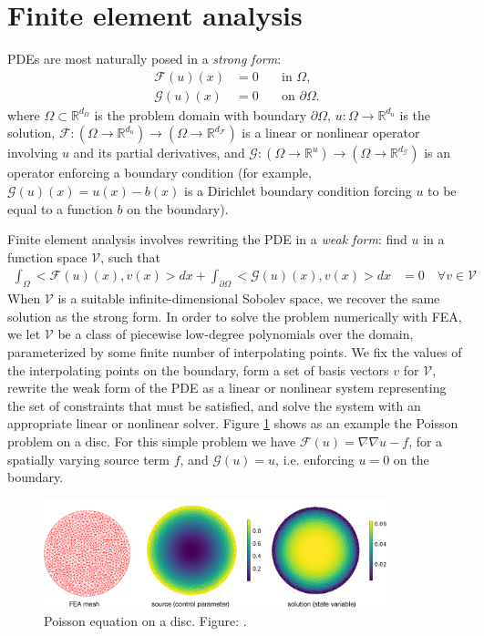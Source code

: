\section{Finite element analysis}
\label{sec:metapde-fea}
PDEs are most naturally posed in a \emph{strong form}:
\begin{align}
\mathcal{F}(u)(x) &= 0 \quad &\text{in } \Omega, \label{eq:metapde-strongform} \\
\mathcal{G}(u)(x) &= 0 \quad &\text{on } \partial \Omega. \label{eq:metapde-bc}
\end{align}
where $\Omega \subset \mathbb{R}^{d_\Omega}$ is the problem domain with boundary $\partial \Omega$, $u: \Omega \to \mathbb{R}^{d_u}$
is the solution,
$\mathcal{F}: (\Omega \to \mathbb{R}^{d_u}) \to (\Omega \to \mathbb{R}^{d_\mathcal{F}})$
is a linear or nonlinear operator involving $u$ and its
partial derivatives, and
$\mathcal{G}: (\Omega \to \mathbb{R}^{u}) \to (\Omega \to \mathbb{R}^{d_\mathcal{G}})$
is an operator enforcing a boundary condition
(for example, $\mathcal{G}(u)(x) = u(x) - b(x)$ is a Dirichlet boundary condition
forcing $u$ to be equal to a function $b$ on the boundary).

Finite element analysis involves rewriting the PDE in a \emph{weak form}:
find $u$ in a function space $\mathcal{V}$, such that
\begin{align}
\int_{\Omega} <\mathcal{F}(u)(x), v(x)> dx + \int_{\partial \Omega} <\mathcal{G}(u)(x), v(x)> dx &= 0 \quad \forall v \in \mathcal{V} \label{eq:metapde-eakform}
\end{align}
When $\mathcal{V}$ is a suitable infinite-dimensional Sobolev space,
we recover the same solution as the strong form.
In order to solve the problem numerically with FEA,
we let $\mathcal{V}$ be a class of piecewise low-degree polynomials over the domain,
parameterized by some finite number of interpolating points.
We fix the values of the interpolating points on the boundary, form a set of basis
vectors $v$ for $\mathcal{V}$, rewrite the weak form of the PDE as a linear or
nonlinear system representing the set of constraints that must be satisfied,
and solve the system with an appropriate linear or nonlinear solver.
Figure \ref{fig:metapde-poisson} shows as an example the Poisson problem on a disc.
For this simple problem we have $\mathcal{F}(u) = \nabla \dot{} \nabla u - f$, for
a spatially varying source term $f$, and $\mathcal{G}(u) = u$, i.e. enforcing $u=0$
on the boundary.

\begin{figure}[t]
  \centering
\includegraphics[width=10cm]{meta-pde/figures/poisson_equation.pdf}
\caption{\small Poisson equation on a disc.
Figure: \citet{xue2020amortized}.}%
\label{fig:metapde-poisson}%
\end{figure}

